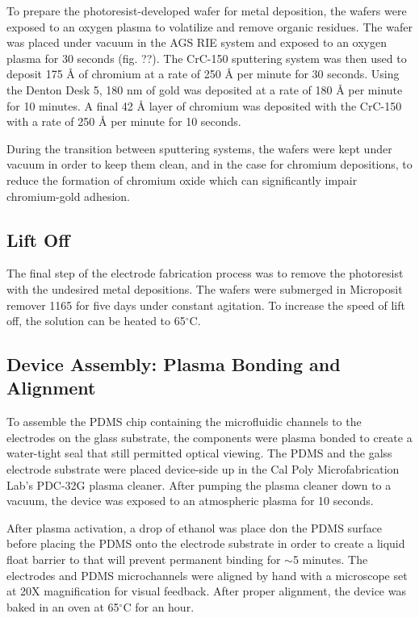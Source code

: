 \par To prepare the photoresist-developed wafer for metal deposition, the wafers were exposed to an oxygen plasma to volatilize and remove organic residues. The wafer was placed under vacuum in the AGS RIE system and exposed to an oxygen plasma for 30 seconds (fig. ??). The CrC-150 sputtering system was then used to deposit 175 \si{\angstrom} of chromium at a rate of 250 \si{\angstrom} per minute for 30 seconds. Using the Denton Desk 5, 180 nm of gold was deposited at a rate of 180 \si{\angstrom} per minute for 10 minutes. A final 42 \si{\angstrom} layer of chromium was deposited with the CrC-150 with a rate of 250 \si{\angstrom} per minute for 10 seconds. 

\par During the transition between sputtering systems, the wafers were kept under vacuum in order to keep them clean, and in the case for chromium depositions, to reduce the formation of chromium oxide which can significantly impair chromium-gold adhesion.

\subsection*{Lift Off}

The final step of the electrode fabrication process was to remove the photoresist with the undesired metal depositions. The wafers were submerged in Microposit remover 1165 for five days under constant agitation. To increase the speed of lift off, the solution can be heated to 65$^\circ$C.

\subsection{Device Assembly: Plasma Bonding and Alignment}
\par To assemble the PDMS chip containing the microfluidic channels to the electrodes on the glass substrate, the components were plasma bonded to create a water-tight seal that still permitted optical viewing. The PDMS and the galss electrode substrate were placed device-side up in the Cal Poly Microfabrication Lab's PDC-32G plasma cleaner. After pumping the plasma cleaner down to a vacuum, the device was exposed to an atmospheric plasma for 10 seconds.  

\par After plasma activation, a drop of ethanol was place don the PDMS surface before placing the PDMS onto the electrode substrate in order to create a liquid float barrier to that will prevent permanent binding for $\sim$5 minutes. The electrodes and PDMS microchannels were aligned by hand with a microscope set at 20X magnification for visual feedback. After proper alignment, the device was baked in an oven at 65$^\circ$C for an hour. 